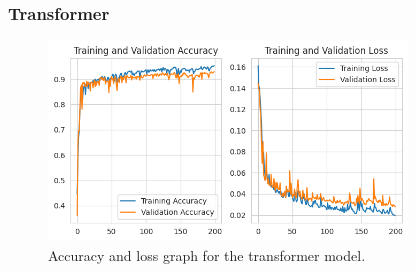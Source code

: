 \subsubsection{Transformer}

\begin{figure}[ht]
    \centering
    \includegraphics[width=0.85\textwidth]{./img/transformer/accuracy-loss-graph}
    \caption{Accuracy and loss graph for the transformer model.}
    \label{fig:transformer-accuracy-loss-graph}
\end{figure}

